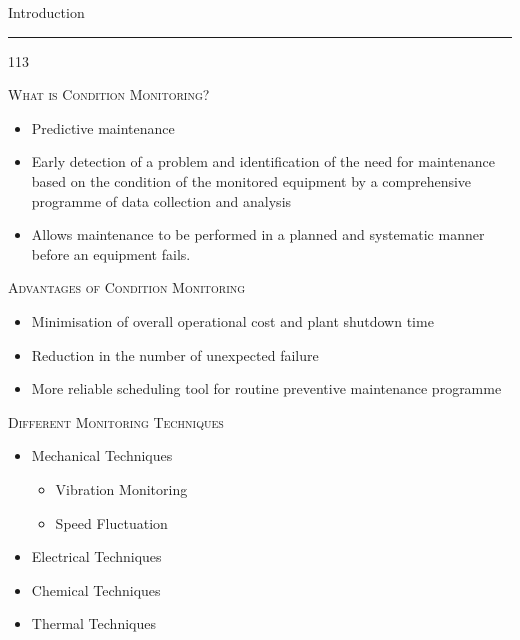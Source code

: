 \documentclass[10pt]{beamer}
\begin{document}
\begin{slide*}
{\large \textsf{Introduction}}\\
\hrule
\vspace{10pt}
\begin{dinglist} {113}
\item \textsc{What is Condition Monitoring?}
    \begin{itemize} 
    \item Predictive maintenance
    \item Early detection of a problem and identification of the need for maintenance based on the condition of the monitored equipment by a comprehensive programme of data collection and analysis
    \item Allows maintenance to be performed in a planned and systematic manner before an equipment fails.
    \end{itemize}
\item \textsc{Advantages of Condition Monitoring}
    \begin{itemize}
    \item Minimisation of overall operational cost and plant shutdown time
    \item Reduction in the number of unexpected failure
    \item More reliable scheduling tool for routine preventive maintenance programme
    \end{itemize}
\item \textsc{Different Monitoring Techniques}
    \begin{itemize}
    \item Mechanical Techniques
            \begin{itemize}
            \item Vibration Monitoring
            \item Speed Fluctuation
            \end{itemize}
    \item Electrical Techniques
    \item Chemical Techniques
    \item Thermal Techniques
    \end{itemize}
\end{dinglist}
\end{slide*}
\end{document}
